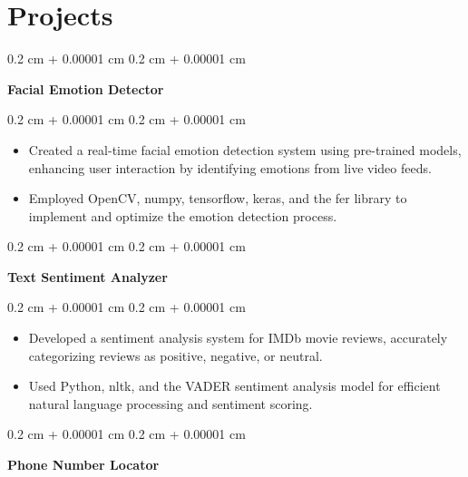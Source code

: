 \documentclass[12pt, letterpaper]{article}
\newenvironment{highlights}{
    \begin{itemize}[
        topsep=0.10 cm,
        parsep=0.10 cm,
        partopsep=0pt,
        itemsep=0pt,
        leftmargin=0.4 cm + 10pt
    ]
}{
    \end{itemize}
} %
\newenvironment{onecolentry}{
    \begin{adjustwidth}{
        0.2 cm + 0.00001 cm
    }{
        0.2 cm + 0.00001 cm
    }
}{
    \end{adjustwidth}
} %
\begin{document}
    
    \section{Projects}



        
        \begin{onecolentry}
            \textbf{Facial Emotion Detector}
        \end{onecolentry}

        \vspace{0.10 cm}
        \begin{onecolentry}
            \begin{highlights}
                \item Created a real-time facial emotion detection system using pre-trained models, enhancing user interaction by identifying emotions from live video feeds.
                \item Employed OpenCV, numpy, tensorflow, keras, and the fer library to implement and optimize the emotion detection process.
            \end{highlights}
        \end{onecolentry}


        \vspace{0.2 cm}

        \begin{onecolentry}
            \textbf{Text Sentiment Analyzer}
        \end{onecolentry}

        \vspace{0.10 cm}
        \begin{onecolentry}
            \begin{highlights}
                \item Developed a sentiment analysis system for IMDb movie reviews, accurately categorizing reviews as positive, negative, or neutral.
                \item Used Python, nltk, and the VADER sentiment analysis model for efficient natural language processing and sentiment scoring.
            \end{highlights}
        \end{onecolentry}


        \vspace{0.2 cm}

        \begin{onecolentry}
            \textbf{Phone Number Locator}
        \end{onecolentry}
\end{document}
